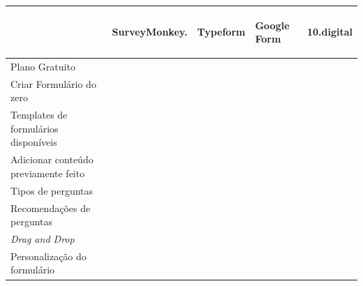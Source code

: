 		\renewcommand{\arraystretch}{2.5}
		\setlength\arrayrulewidth{1.5pt}
	\begin{table}[!ht]  
		\centering
		\begin{tabular}{|p{4cm}|p{1.5cm}|p{1.5cm}|p{1.5cm}|p{1.5cm}|}
			\cline{2-5}
			\multicolumn{1}{c|}{} & \hspace{0.6cm}\begin{sideways}SurveyMonkey.\end{sideways} & \hspace{0.6cm}\begin{sideways}Typeform\end{sideways} & \hspace{0.6cm}\begin{sideways}Google Form\end{sideways} &\hspace{0.6cm}\begin{sideways} 10.digital\end{sideways}\\ \hline
			
			Plano Gratuito & \cellcolor{blue!25}   & \cellcolor{blue!25}  & \cellcolor{blue!25} & \cellcolor{blue!25}  \\ \hline
			
			Criar Formulário do zero & \cellcolor{blue!25}  & \cellcolor{blue!25}  & \cellcolor{blue!25} & \cellcolor{blue!25} \\ \hline
			
			Templates de formulários disponíveis& \cellcolor{blue!25}  & \cellcolor{blue!25} & \cellcolor{blue!25} & \cellcolor{blue!25} \\ \hline
			
			Adicionar conteúdo previamente feito & \cellcolor{blue!25}   & \cellcolor{blue!25}  & \cellcolor{blue!25} & \cellcolor{blue!25}  \\ \hline
			
			Tipos de perguntas & \cellcolor{blue!25}   & \cellcolor{blue!25}  & \cellcolor{blue!25} & \cellcolor{blue!25}  \\ \hline
			
			 Recomendações de perguntas& \cellcolor{blue!25}   & \cellcolor{blue!25}  & \cellcolor{blue!25} & \cellcolor{blue!25}  \\ \hline
			
			\textit{Drag and Drop} & \cellcolor{blue!25}   & \cellcolor{blue!25}  & \cellcolor{blue!25} & \cellcolor{blue!25}  \\ \hline
			
			Personalização do formulário& \cellcolor{blue!25}   & \cellcolor{blue!25}  & \cellcolor{blue!25} & \cellcolor{blue!25}  \\ \hline
			

\end{tabular}
\end{table}
